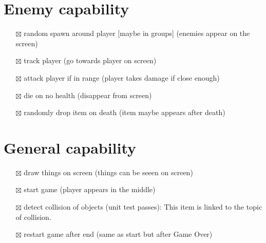 \documentclass[
]{article}
\providecommand{\tightlist}{%
  \setlength{\itemsep}{0pt}\setlength{\parskip}{0pt}}
\begin{document}
\section{Enemy capability}\label{enemy-capability}

\begin{itemize}
\tightlist
\item[$\boxtimes$]
  random spawn around player {[}maybe in groups{]} (enemies appear on
  the screen)
\item[$\boxtimes$]
  track player (go towards player on screen)
\item[$\boxtimes$]
  attack player if in range (player takes damage if close enough)
\item[$\boxtimes$]
  die on no health (disappear from screen)
\item[$\boxtimes$]
  randomly drop item on death (item maybe appears after death)
\end{itemize}

\section{General capability}\label{general-capability}

\begin{itemize}
\tightlist
\item[$\boxtimes$]
  draw things on screen (things can be seeen on screen)
\item[$\boxtimes$]
  start game (player appears in the middle)
\item[$\boxtimes$]
  detect collision of objects (unit test passes): This item is linked to the topic of collision. 
\item[$\boxtimes$]
  restart game after end (same as start but after Game Over)
\end{itemize}
\end{document}
